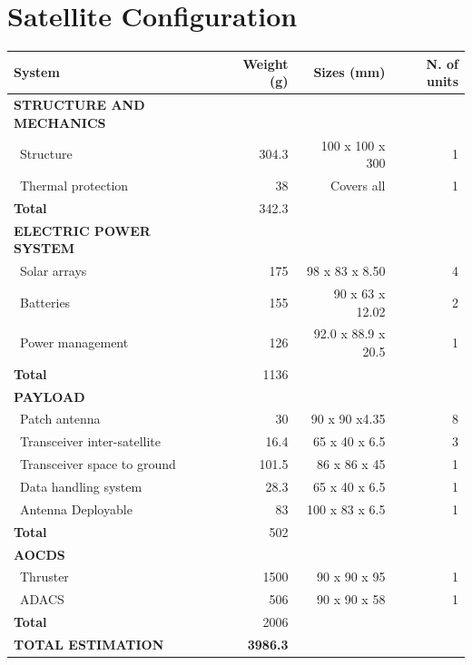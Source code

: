 \clearpage
\chapter{Satellite Configuration}

\begin{longtable}{| l | r | r | r |}
	\hline
	\rowcolor[gray]{0.80}	\textbf{System}& \textbf{Weight (g)} & \textbf{Sizes (mm)} & \textbf{N. of units}\\
	\hline
	\hline
	\endfirsthead
	
	
	\rowcolor[gray]{0.85} \textbf{STRUCTURE AND MECHANICS} & & & \\ \hline
	
	~Structure & 304.3 & 100 x 100 x 300& 1 \\
	~Thermal protection & 38 & Covers all & 1\\
	\hline 
	\rowcolor[gray]{0.95} \textbf{Total} & 342.3 & &  \\
	\hline \hline
	
	\rowcolor[gray]{0.85} \textbf{ELECTRIC POWER SYSTEM} & & & \\\hline
	
	~Solar arrays & 175 & 98 x 83 x 8.50 & 4 \\
	~Batteries & 155 & 90 x 63 x 12.02 & 2 \\
	~Power management & 126 & 92.0 x 88.9 x 20.5 & 1 \\
	\hline
	\rowcolor[gray]{0.95} \textbf{Total} & 1136 &  &  \\
	\hline \hline
	
	\rowcolor[gray]{0.85} \textbf{PAYLOAD} & & & \\ \hline
	
	~Patch antenna & 30 & 90 x 90 x4.35& 8 \\
	~Transceiver inter-satellite & 16.4 & 65 x 40 x 6.5 & 3 \\
	~Transceiver space to ground & 101.5 & 86 x 86 x 45 & 1 \\
	~Data handling system & 28.3 & 65 x 40 x 6.5 & 1\\
	~Antenna Deployable & 83 & 100 x 83 x 6.5 &1\\
	\hline
	\rowcolor[gray]{0.95} \textbf{Total} & 502 &  & \\
	\hline \hline \hline
	
	\rowcolor[gray]{0.85} \textbf{AOCDS} & & &\\ \hline
	
	~Thruster & 1500 & 90 x 90 x 95 & 1 \\
	~ADACS & 506 & 90 x 90 x 58 & 1 \\
	\hline
	\rowcolor[gray]{0.95} \textbf{Total} & 2006 &  & \\
	\hline \hline
	
	\rowcolor[gray]{0.9} \textbf{TOTAL ESTIMATION} & \textbf{3986.3} & & \\ \hline
	
	
\end{longtable} 
\clearpage
